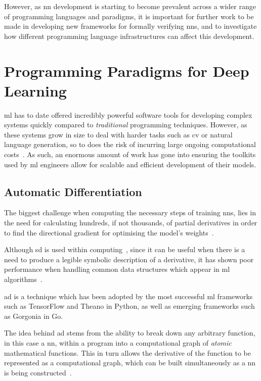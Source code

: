 However, as \gls{nn} development is starting to become prevalent across a wider range of programming languages and
paradigms, it is important for further work to be made in developing new frameworks for formally verifying \glspl{nn}, and to 
investigate how different programming language infrastructures can affect this development.

\section{Programming Paradigms for Deep Learning}\label{section:paradigms}

\gls{ml} has to date offered incredibly powerful software tools for developing complex
systems quickly compared to \textit{traditional} programming techniques. However, as these
systems grow in size to deal with harder tasks such as \gls{cv} or natural language generation, 
so to does the risk of incurring large ongoing computational costs~\citep{sculley2015}. As such, an enormous amount
of work has gone into ensuring the toolkits used by \gls{ml} engineers allow for scalable and efficient development
of their models.

\subsection{Automatic Differentiation}

The biggest challenge when computing the necessary steps of training \glspl{nn}, lies
in the need for calculating hundreds, if not thousands, of partial derivatives in order
to find the directional gradient for optimising the model's weights~\citep{steinitz2013}.

Although \gls{sd} is used within computing~\citep{maxima2020, trott2006}, since it can be useful when there is a need to 
produce a legible symbolic description of a derivative, it has shown poor performance when 
handling common data structures which appear in \gls{ml} algorithms~\citep{achyutuni2020}.

\Gls{ad} is a technique which has been adopted by the most successful \gls{ml} frameworks
such as TensorFlow and Theano in Python, as well as emerging frameworks such as Gorgonia in Go.

The idea behind \gls{ad} stems from the ability to break down any arbitrary function, in this case a \gls{nn}, within a program 
into a computational graph of \textit{atomic} mathematical functions. This in turn allows the derivative
of the function to be represented as a computational graph, which can be built simultaneously as
a \gls{nn} is being constructed~\citep{baydin2015}.


